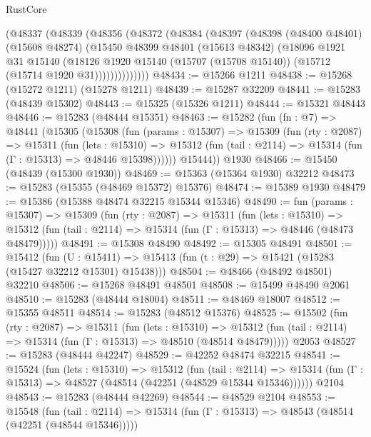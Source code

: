 \begin{lexlean}{RustCore}
\begin{coremodule}
        (@48337
          (@48339
            (@48356
              (@48372
                (@48384
                  (@48397
                    (@48398
                      (@48400 @48401)
                      (@15608 @48274)
                      (@15450
                        @48399
                        @48401
                        (@15613 @48342)
                        (@18096
                          @1921
                          @31
                          @15140
                          (@18126
                            @1920
                            @15140
                            (@15707 (@15708 @15140))
                            (@15712 (@15714 @1920 @31))))))))))))))
@48434 := @15266 @1211
@48438 := @15268 (@15272 @1211) (@15278 @1211)
@48439 := @15287 @32209
@48441 := @15283 (@48439 @15302)
@48443 := @15325 (@15326 @1211)
@48444 := @15321 @48443
@48446 := @15283 (@48444 @15351)
@48463 := @15282
    (fun (fn : @7) =>
    @48441
      (@15305
        (@15308
          (fun (params : @15307) =>
          @15309
            (fun (rty : @2087) =>
            @15311
              (fun (lets : @15310) =>
              @15312 (fun (tail : @2114) => @15314 (fun (Γ : @15313) => @48446 @15398))))))
        @15444))
    @1930
@48466 := @15450 (@48439 (@15300 @1930))
@48469 := @15363 (@15364 @1930) @32212
@48473 := @15283 (@15355 (@48469 @15372) @15376)
@48474 := @15389 @1930
@48479 := @15386 (@15388 @48474 @32215 @15344 @15346)
@48490 := fun (params : @15307) =>
  @15309
    (fun (rty : @2087) =>
    @15311
      (fun (lets : @15310) =>
      @15312 (fun (tail : @2114) => @15314 (fun (Γ : @15313) => @48446 (@48473 @48479)))))
@48491 := @15308 @48490
@48492 := @15305 @48491
@48501 := @15412
    (fun (U : @15411) => @15413 (fun (t : @29) => @15421 (@15283 (@15427 @32212 @15301) @15438)))
@48504 := @48466 (@48492 @48501) @32210
@48506 := @15268 @48491 @48501
@48508 := @15499 @48490 @2061
@48510 := @15283 (@48444 @18004)
@48511 := @48469 @18007
@48512 := @15355 @48511
@48514 := @15283 (@48512 @15376)
@48525 := @15502
    (fun (rty : @2087) =>
    @15311
      (fun (lets : @15310) =>
      @15312 (fun (tail : @2114) => @15314 (fun (Γ : @15313) => @48510 (@48514 @48479)))))
    @2053
@48527 := @15283 (@48444 @42247)
@48529 := @42252 @48474 @32215
@48541 := @15524
    (fun (lets : @15310) =>
    @15312
      (fun (tail : @2114) =>
      @15314 (fun (Γ : @15313) => @48527 (@48514 (@42251 (@48529 @15344 @15346))))))
    @2104
@48543 := @15283 (@48444 @42269)
@48544 := @48529 @2104
@48553 := @15548
    (fun (tail : @2114) => @15314 (fun (Γ : @15313) => @48543 (@48514 (@42251 (@48544 @15346)))))

\end{coremodule}
\end{lexlean}
